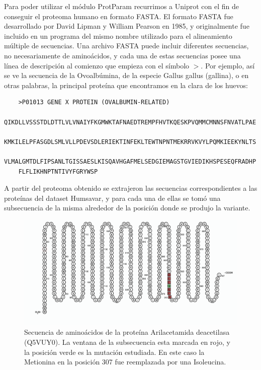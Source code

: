 Para poder utilizar el módulo ProtParam recurrimos a Uniprot con el fin de conseguir el proteoma humano en formato FASTA. El formato FASTA fue desarrollado por David Lipman y William Pearson en 1985, y originalmente fue incluido en un programa del mismo nombre utilizado para el alineamiento múltiple de secuencias. Una archivo FASTA puede incluir diferentes secuencias, no necesariamente de aminoácidos, y cada una de estas secuencias posee una línea de descripción al comienzo que empieza con el símbolo $>$. Por ejemplo, así se ve la secuencia de la Ovoalbúmina, de la especie Gallus gallus (gallina), o en otras palabras, la principal proteína que encontramos en la clara de los huevos:

\begin{verbatim}
	>P01013 GENE X PROTEIN (OVALBUMIN-RELATED)
	QIKDLLVSSSTDLDTTLVLVNAIYFKGMWKTAFNAEDTREMPFHVTKQESKPVQMMCMNNSFNVATLPAE
	KMKILELPFASGDLSMLVLLPDEVSDLERIEKTINFEKLTEWTNPNTMEKRRVKVYLPQMKIEEKYNLTS
	VLMALGMTDLFIPSANLTGISSAESLKISQAVHGAFMELSEDGIEMAGSTGVIEDIKHSPESEQFRADHP
	FLFLIKHNPTNTIVYFGRYWSP
\end{verbatim}

\pagebreak

A partir del proteoma obtenido se extrajeron las secuencias correspondientes a las proteínas del dataset Humsavar, y para cada una de ellas se tomó una subsecuencia de la misma alrededor de la posición donde se produjo la variante.





\begin{figure}[H]
    \centering
    \includegraphics[scale=0.50]{documents/latex/figures/3/structural/sequence_window.png}
    \caption{Secuencia de aminoácidos de la proteína Arilacetamida deacetilasa (Q5VUY0). La ventana de la subsecuencia esta marcada en rojo, y la posición verde es la mutación estudiada. En este caso la Metionina en la posición 307 fue reemplazada por una Isoleucina.}
    \label{fig:sequence_window}
\end{figure}

